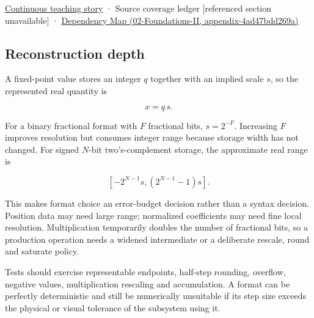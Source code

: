 \hyperref[01-foundations-i-ch001-choosing-what-information-to-keep]{Continuous teaching story} · {Source coverage ledger {[}referenced section unavailable{]}} · \href{../02-Foundations-II/main.pdf\#nameddest=appendix-4ad47bdd269a}{Dependency Map (02-Foundations-II, appendix-4ad47bdd269a)}

\subsection{Reconstruction depth}\label{appendix-ceb4c4a9b5a1-reconstruction-depth}

A fixed-point value stores an integer \(q\) together with an implied scale \(s\), so the represented real quantity is

\[
x=q\,s.
\]

For a binary fractional format with \(F\) fractional bits, \(s=2^{-F}\). Increasing \(F\) improves resolution but consumes integer range because storage width has not changed. For signed \(N\)-bit two's-complement storage, the approximate real range is

\[
[-2^{N-1}s,(2^{N-1}-1)s].
\]

This makes format choice an error-budget decision rather than a syntax decision. Position data may need large range; normalized coefficients may need fine local resolution. Multiplication temporarily doubles the number of fractional bits, so a production operation needs a widened intermediate or a deliberate rescale, round and saturate policy.

Tests should exercise representable endpoints, half-step rounding, overflow, negative values, multiplication rescaling and accumulation. A format can be perfectly deterministic and still be numerically unsuitable if its step size exceeds the physical or visual tolerance of the subsystem using it.
